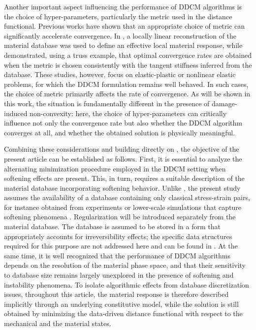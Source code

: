 \documentclass[10pt,review]{cas-sc}
\begin{document}
Another important aspect influencing the performance of DDCM algorithms is the choice of hyper-parameters, particularly the metric used in the distance functional. Previous works have shown that an appropriate choice of metric can significantly accelerate convergence. In \cite{Pham2023}, a locally linear reconstruction of the material database was used to define an effective local material response, while \cite{Nguyen2022} demonstrated, using a truss example, that optimal convergence rates are obtained when the metric is chosen consistently with the tangent stiffness inferred from the database. These studies, however, focus on elastic-plastic or nonlinear elastic problems, for which the DDCM formulation remains well behaved. In such cases, the choice of metric primarily affects the rate of convergence. As will be shown in this work, the situation is fundamentally different in the presence of damage-induced non-convexity: here, the choice of hyper-parameters can critically influence not only the convergence rate but also whether the DDCM algorithm converges at all, and whether the obtained solution is physically meaningful.

Combining these considerations and building directly on \cite{Kamasamudram2023}, the objective of the present article can be established as follows. First, it is essential to analyze the alternating minimization procedure employed in the DDCM setting when softening effects are present. This, in turn, requires a suitable description of the material database incorporating softening behavior. Unlike \cite{Ulloa2024}, the present study assumes the availability of a database containing only classical stress-strain pairs, for instance obtained from experiments or lower-scale simulations that capture softening phenomena \cite{nguyen2010existence,nguyen2012enhanced,Nguyen2019}. Regularization will be introduced separately from the material database. The database is assumed to be stored in a form that appropriately accounts for irreversibility effects; the specific data structures required for this purpose are not addressed here and can be found in \cite{Eggersmann2021a,Dandin2024}. At the same time, it is well recognized that the performance of DDCM algorithms depends on the resolution of the material phase space, and that their sensitivity to database size remains largely unexplored in the presence of softening and instability phenomena. To isolate algorithmic effects from database discretization issues, throughout this article, the material response is therefore described implicitly through an underlying constitutive model, while the solution is still obtained by minimizing the data-driven distance functional with respect to the mechanical and the material states.
\end{document}
